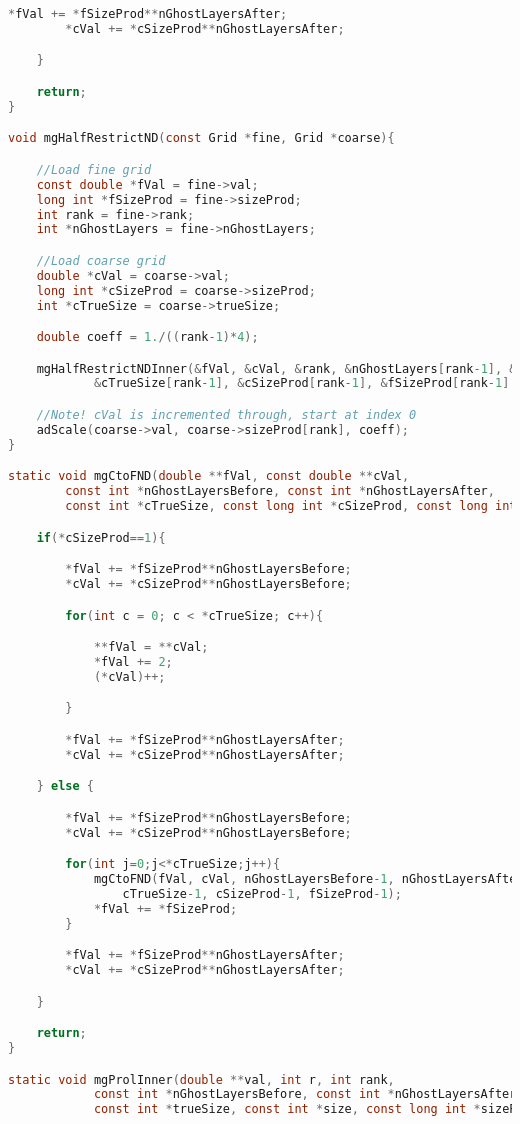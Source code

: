 \begin{lstlisting}[language=c, caption = main routine]
		*fVal += *fSizeProd**nGhostLayersAfter;
		*cVal += *cSizeProd**nGhostLayersAfter;

	}

	return;
}

void mgHalfRestrictND(const Grid *fine, Grid *coarse){

	//Load fine grid
	const double *fVal = fine->val;
	long int *fSizeProd = fine->sizeProd;
	int rank = fine->rank;
	int *nGhostLayers = fine->nGhostLayers;

	//Load coarse grid
	double *cVal = coarse->val;
	long int *cSizeProd = coarse->sizeProd;
	int *cTrueSize = coarse->trueSize;

	double coeff = 1./((rank-1)*4);

	mgHalfRestrictNDInner(&fVal, &cVal, &rank, &nGhostLayers[rank-1], &nGhostLayers[2*rank-1],
			&cTrueSize[rank-1], &cSizeProd[rank-1], &fSizeProd[rank-1] );

	//Note! cVal is incremented through, start at index 0
	adScale(coarse->val, coarse->sizeProd[rank], coeff);
}

static void mgCtoFND(double **fVal, const double **cVal,
		const int *nGhostLayersBefore, const int *nGhostLayersAfter,
		const int *cTrueSize, const long int *cSizeProd, const long int *fSizeProd){

	if(*cSizeProd==1){

		*fVal += *fSizeProd**nGhostLayersBefore;
		*cVal += *cSizeProd**nGhostLayersBefore;

		for(int c = 0; c < *cTrueSize; c++){

			**fVal = **cVal;
			*fVal += 2;
			(*cVal)++;

		}

		*fVal += *fSizeProd**nGhostLayersAfter;
		*cVal += *cSizeProd**nGhostLayersAfter;

	} else {

		*fVal += *fSizeProd**nGhostLayersBefore;
		*cVal += *cSizeProd**nGhostLayersBefore;

		for(int j=0;j<*cTrueSize;j++){
			mgCtoFND(fVal, cVal, nGhostLayersBefore-1, nGhostLayersAfter-1,
				cTrueSize-1, cSizeProd-1, fSizeProd-1);
			*fVal += *fSizeProd;
		}

		*fVal += *fSizeProd**nGhostLayersAfter;
		*cVal += *cSizeProd**nGhostLayersAfter;

	}

	return;
}

static void mgProlInner(double **val, int r, int rank,
			const int *nGhostLayersBefore, const int *nGhostLayersAfter,
		 	const int *trueSize, const int *size, const long int *sizeProd){


\end{lstlisting}
